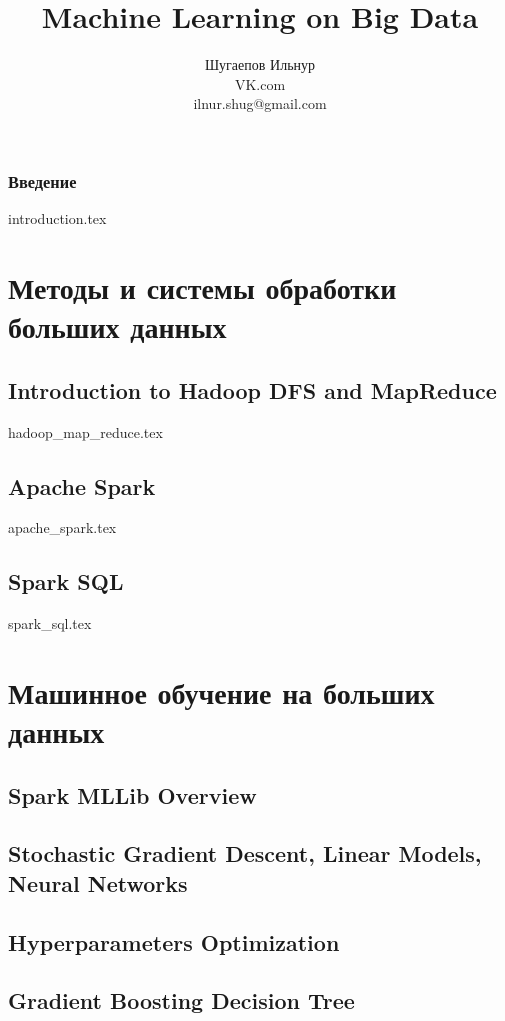 \documentclass[openany,12pt]{book}
\title{Machine Learning on Big Data}
\author{Шугаепов Ильнур 
\\
\small{VK.com} 
\\
\small{ilnur.shug@gmail.com}}
\date{}
\numberwithin{equation}{section}
\begin{document}
\maketitle

\tableofcontents

\section*{Введение}
{introduction.tex}
 
\part{Методы и системы обработки больших данных}
\chapter{Introduction to Hadoop DFS and MapReduce}
{hadoop_map_reduce.tex}


\chapter{Apache Spark}
{apache_spark.tex}

\chapter{Spark SQL}
{spark_sql.tex}

\part{Машинное обучение на больших данных}
\chapter{Spark MLLib Overview}

\chapter{Stochastic Gradient Descent, Linear Models, Neural Networks}

\chapter{Hyperparameters Optimization}

\chapter{Gradient Boosting Decision Tree}
\end{document}
